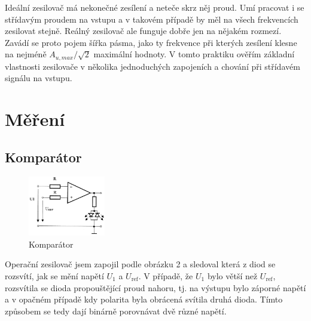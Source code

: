 \documentclass[a4paper,11pt]{article}
\begin{document}
Ideální zesilovač má nekonečné zesílení a neteče skrz něj proud. Umí pracovat i se střídavým proudem na vstupu a v takovém případě by měl na všech frekvencích zesilovat stejně. Reálný zesilovač ale funguje dobře jen na nějakém rozmezí. Zavádí se proto pojem šířka pásma, jako ty frekvence při kterých zesílení klesne na nejméně $ A_{u, max} / \sqrt{2}  $  maximální hodnoty. V tomto praktiku ověřím základní vlastnosti zesilovače v několika jednoduchých zapojeních a chování při střídavém signálu na vstupu.

\vspace{20pt}

\section{Měření}

\subsection{Komparátor}

\begin{figure}
    \vspace{-30pt}
    \centering
    \includegraphics[width=0.3\textwidth]{komparator.jpg}
    \caption{Komparátor}
\end{figure}

Operační zesilovač jsem zapojil podle obrázku 2 a sledoval která z diod se rozsvítí, jak se mění napětí $ U_1 $  a $ U_\text{ref} $. V případě, že $ U_1 $ bylo větší než $ U_{\text{ref}} $, rozsvítila se dioda propouštějící proud nahoru, tj. na výstupu bylo záporné napětí a v opačném případě kdy polarita byla obrácená svítila druhá dioda. Tímto způsobem se tedy dají binárně porovnávat dvě různé napětí.



\par\noindent
\end{document}
